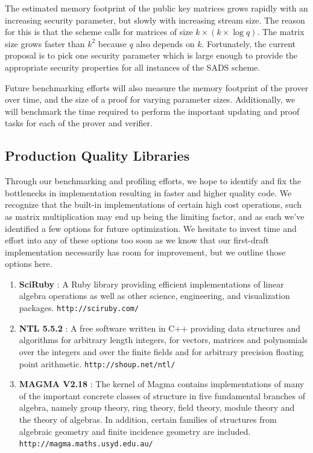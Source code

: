 \documentclass[11pt, letterpaper, oneside]{article}
\begin{document}
	The estimated memory footprint of the public key matrices grows rapidly with an increasing security parameter, but slowly with increasing stream size.
	The reason for this is that the scheme calls for matrices of size $k  \times ( k \times \log q )$.
	The matrix size grows faster than $k^2$ because $q$ also depends on $k$.
	Fortunately, the current proposal is to pick one security parameter which is large enough to provide the appropriate security properties for all instances of the SADS scheme.
	
	Future benchmarking efforts will also measure the memory footprint of the prover over time, and the size of a proof for varying parameter sizes. Additionally, we will benchmark the time required to perform the important updating and proof tasks for each of the prover and verifier. 
	


	\subsection{ Production Quality Libraries }
	
	Through our benchmarking and profiling efforts, we hope to identify and fix the bottlenecks in implementation resulting in faster and higher quality code.
	We recognize that the built-in implementations of certain high cost operations, such as matrix multiplication may end up being the limiting factor, and as such we've identified a few options for future optimization.
	We hesitate to invest time and effort into any of these options too soon as we know that our first-draft implementation necessarily has room for improvement, but we outline those options here.

	\begin{enumerate}
	\item \textbf{SciRuby} : A Ruby library providing efficient implementations of linear algebra operations as well as other science, engineering, and visualization packages. \texttt{http://sciruby.com/}
	\item \textbf{NTL 5.5.2} : A free software written in C++ providing data structures and algorithms for arbitrary length integers, for vectors, matrices and polynomials over the integers and over the finite fields and for arbitrary precision floating point arithmetic. \texttt{http://shoup.net/ntl/}
	\item \textbf{MAGMA V2.18} : The kernel of Magma contains implementations of many of the important concrete classes of structure in five fundamental branches of algebra, namely group theory, ring theory, field theory, module theory and the theory of algebras.
	In addition, certain families of structures from algebraic geometry and finite incidence geometry are included. \texttt{http://magma.maths.usyd.edu.au/}
	\end{enumerate}
\end{document}

